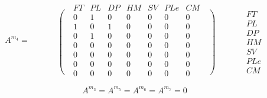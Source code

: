 \begin{equation*}
A^{m_4}=\begin{matrix}\text{ }\\\left.\phantom{\begin{matrix}\mathit{FT}\\\mathit{PL}\\\mathit{DP}\\\mathit{HM}\\\mathit{SV}\\\mathit{PLe}\\\mathit{CM}\end{matrix}}\right(\end{matrix}\begin{matrix}\mathit{FT}&\mathit{PL}&\mathit{DP}&\mathit{HM}&\mathit{SV}&\mathit{PLe}&\mathit{CM}\\0&1&0&0&0&0&0\\1&0&1&0&0&0&0\\0&1&0&0&0&0&0\\0&0&0&0&0&0&0\\0&0&0&0&0&0&0\\0&0&0&0&0&0&0\\0&0&0&0&0&0&0\end{matrix}\begin{matrix}\text{ }\\\left)\phantom{\begin{matrix}\mathit{FT}\\\mathit{PL}\\\mathit{DP}\\\mathit{HM}\\\mathit{SV}\\\mathit{PLe}\\\mathit{CM}\end{matrix}}\right.\end{matrix}\begin{matrix}\text{ }\\\mathit{FT}\\\mathit{PL}\\\mathit{DP}\\\mathit{HM}\\\mathit{SV}\\\mathit{PLe}\\\mathit{CM}\end{matrix}
\end{equation*}

\bigskip

\begin{equation*}
A^{m_3}=A^{m_5}=A^{m_6}=A^{m_7}=0
\end{equation*}

